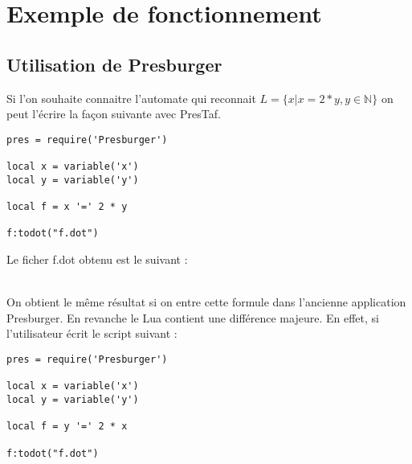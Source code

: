 \section{Exemple de fonctionnement}

\subsection{Utilisation de Presburger}

Si l'on souhaite connaitre l'automate qui reconnait $L = \{x | x = 2*y, y \in \mathbb{N} \}$ on peut l'écrire la façon suivante avec PresTaf.\\


\begin{lstlisting}[mathescape=true, frame=single]
pres = require('Presburger')

local x = variable('x')
local y = variable('y')

local f = x '=' 2 * y 

f:todot("f.dot")
\end{lstlisting}

Le ficher f.dot obtenu est le suivant :

\vspace{0.5cm}

\\

On obtient le même résultat si on entre cette formule dans l'ancienne application Presburger. En revanche le Lua contient une différence majeure. En effet, si l'utilisateur écrit le script suivant :

\begin{lstlisting}[mathescape=true, frame=single]
pres = require('Presburger')

local x = variable('x')
local y = variable('y')

local f = y '=' 2 * x 

f:todot("f.dot")
\end{lstlisting}

